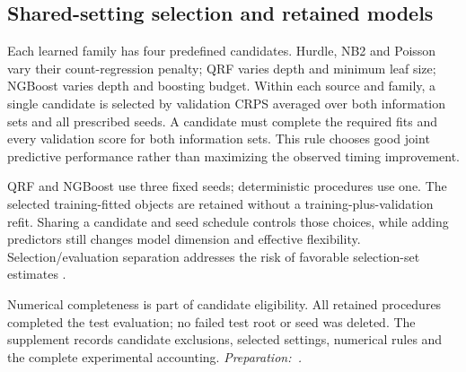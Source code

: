 \hypertarget{shared-setting-selection-and-retained-models}{%
\subsection{Shared-setting selection and retained models}}

Each learned family has four predefined candidates. Hurdle, NB2 and Poisson vary their count-regression penalty; QRF varies depth and minimum leaf size; NGBoost varies depth and boosting budget. Within each source and family, a single candidate is selected by validation CRPS averaged over both information sets and all prescribed seeds. A candidate must complete the required fits and every validation score for both information sets. This rule chooses good joint predictive performance rather than maximizing the observed timing improvement.

QRF and NGBoost use three fixed seeds; deterministic procedures use one. The selected training-fitted objects are retained without a training-plus-validation refit. Sharing a candidate and seed schedule controls those choices, while adding predictors still changes model dimension and effective flexibility. Selection/evaluation separation addresses the risk of favorable selection-set estimates \cite{cawley2010}.

Numerical completeness is part of candidate eligibility. All retained procedures completed the test evaluation; no failed test root or seed was deleted. The supplement records candidate exclusions, selected settings, numerical rules and the complete experimental accounting. {\small\textit{Preparation:~\cite{openai2026}.}}
